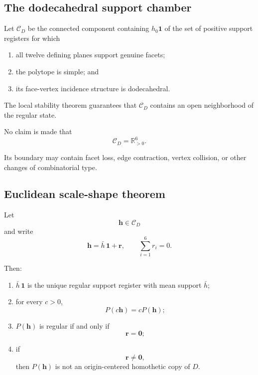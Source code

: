 \subsection{The dodecahedral support chamber}

\begin{definition}
Let \(\mathcal C_D\) be the connected component containing
\(h_0\mathbf 1\) of the set of positive support registers for which

\begin{enumerate}
\item all twelve defining planes support genuine facets;
\item the polytope is simple; and
\item its face-vertex incidence structure is dodecahedral.
\end{enumerate}
\]
\end{definition}

The local stability theorem guarantees that \(\mathcal C_D\) contains an
open neighborhood of the regular state.

No claim is made that
\[
\mathcal C_D=\mathbb R_{>0}^6.
\]

Its boundary may contain facet loss, edge contraction, vertex collision, or
other changes of combinatorial type.

\subsection{Euclidean scale-shape theorem}

\begin{theorem}
Let
\[
\mathbf h\in\mathcal C_D
\]
and write
\[
\mathbf h
=
\bar h\,\mathbf 1+\mathbf r,
\qquad
\sum_{i=1}^{6}r_i=0.
\]

Then:

\begin{enumerate}
\item \(\bar h\,\mathbf 1\) is the unique regular support register with mean
support \(\bar h\);

\item for every \(c>0\),
\[
P(c\mathbf h)=cP(\mathbf h);
\]

\item \(P(\mathbf h)\) is regular if and only if
\[
\mathbf r=\mathbf 0;
\]

\item if
\[
\mathbf r\ne\mathbf 0,
\]
then \(P(\mathbf h)\) is not an origin-centered homothetic copy of \(D\).
\end{enumerate}
\end{theorem}

